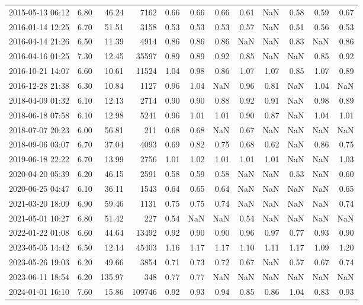 \begin{table}
\begin{tabular}{lrrrrrrrrrrr}
2015-05-13 06:12 & 6.80 & 46.24 & 7162 & 0.66 & 0.66 & 0.66 & 0.61 & NaN & 0.58 & 0.59 & 0.67 \\
2016-01-14 12:25 & 6.70 & 51.51 & 3158 & 0.53 & 0.53 & 0.53 & 0.57 & NaN & 0.51 & 0.56 & 0.53 \\
2016-04-14 21:26 & 6.50 & 11.39 & 4914 & 0.86 & 0.86 & 0.86 & NaN & NaN & 0.83 & NaN & 0.86 \\
2016-04-16 01:25 & 7.30 & 12.45 & 35597 & 0.89 & 0.89 & 0.92 & 0.85 & NaN & NaN & 0.85 & 0.92 \\
2016-10-21 14:07 & 6.60 & 10.61 & 11524 & 1.04 & 0.98 & 0.86 & 1.07 & 1.07 & 0.85 & 1.07 & 0.89 \\
2016-12-28 21:38 & 6.30 & 10.84 & 1127 & 0.96 & 1.04 & NaN & 0.96 & 0.81 & NaN & 1.04 & NaN \\
2018-04-09 01:32 & 6.10 & 12.13 & 2714 & 0.90 & 0.90 & 0.88 & 0.92 & 0.91 & NaN & 0.98 & 0.89 \\
2018-06-18 07:58 & 6.10 & 12.98 & 5241 & 0.96 & 1.01 & 1.01 & 0.90 & 0.87 & NaN & 1.04 & 1.01 \\
2018-07-07 20:23 & 6.00 & 56.81 & 211 & 0.68 & 0.68 & NaN & 0.67 & NaN & NaN & NaN & NaN \\
2018-09-06 03:07 & 6.70 & 37.04 & 4093 & 0.69 & 0.82 & 0.75 & 0.68 & 0.62 & NaN & 0.86 & 0.75 \\
2019-06-18 22:22 & 6.70 & 13.99 & 2756 & 1.01 & 1.02 & 1.01 & 1.01 & 1.01 & NaN & NaN & 1.03 \\
2020-04-20 05:39 & 6.20 & 46.15 & 2591 & 0.58 & 0.59 & 0.58 & NaN & NaN & 0.53 & NaN & 0.60 \\
2020-06-25 04:47 & 6.10 & 36.11 & 1543 & 0.64 & 0.65 & 0.64 & NaN & NaN & NaN & NaN & 0.65 \\
2021-03-20 18:09 & 6.90 & 59.46 & 1131 & 0.75 & 0.75 & 0.74 & NaN & NaN & NaN & NaN & 0.74 \\
2021-05-01 10:27 & 6.80 & 51.42 & 227 & 0.54 & NaN & NaN & 0.54 & NaN & NaN & NaN & NaN \\
2022-01-22 01:08 & 6.60 & 44.64 & 13492 & 0.92 & 0.90 & 0.90 & 0.96 & 0.97 & 0.77 & 0.93 & 0.90 \\
2023-05-05 14:42 & 6.50 & 12.14 & 45403 & 1.16 & 1.17 & 1.17 & 1.10 & 1.11 & 1.17 & 1.09 & 1.20 \\
2023-05-26 19:03 & 6.20 & 49.66 & 3854 & 0.71 & 0.73 & 0.72 & 0.67 & NaN & 0.57 & 0.67 & 0.74 \\
2023-06-11 18:54 & 6.20 & 135.97 & 348 & 0.77 & 0.77 & NaN & NaN & NaN & NaN & NaN & NaN \\
2024-01-01 16:10 & 7.60 & 15.86 & 109746 & 0.92 & 0.93 & 0.94 & 0.85 & 0.86 & 1.04 & 0.83 & 0.93 \\

\end{tabular}
\end{table}
